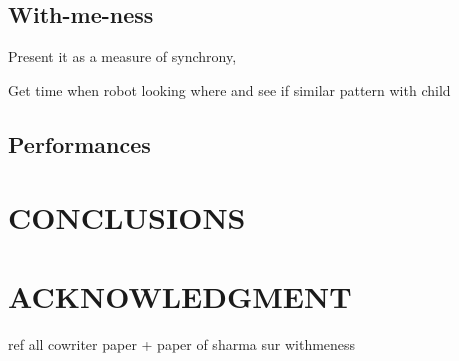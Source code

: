 \documentclass[letterpaper, 10 pt, conference]{ieeeconf}  %
\begin{document}
\subsection{With-me-ness}
\cite{lemaignan2016realtime}
Present it as a measure of synchrony, 

Get time when robot looking where and see if similar pattern with child

\subsection{Performances}


\section{CONCLUSIONS}



\addtolength{\textheight}{-12cm}   %








\section*{ACKNOWLEDGMENT}






ref all cowriter paper + paper of sharma sur withmeness



\end{document}
